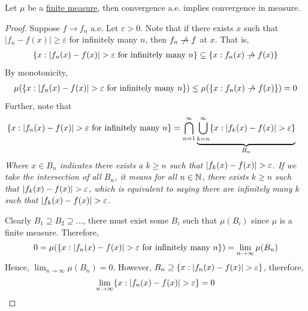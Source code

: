 \documentclass[11pt]{article}
\begin{document}
	\begin{proposition}
		Let $\mu$ be a \ul{finite measure}, then convergence a.e. implies convergence in measure.
		\begin{proof}
			Suppose $f \to f_n$ a.e. Let $\varepsilon > 0$. Note that if there exists $x$ such that $|f_n - f(x)| \geq \varepsilon$ for infinitely many $n$, then $f_n \centernot{\to} f$ at $x$. That is,
			\begin{align}
				\{x: \abs{f_n(x) - f(x)} > \varepsilon \tx{ for infinitely many $n$}\} \subseteq \{x: f_n(x) \centernot{\to} f(x)\}
			\end{align}
			By monotonicity,
			\begin{align}
				\mu(\{x: \abs{f_n(x) - f(x)} > \varepsilon \tx{ for infinitely many $n$}\}) \leq \mu(\{x: f_n(x) \centernot{\to} f(x)\}) = 0
			\end{align}
			Further, note that
			\begin{align}
				\{x: \left \vert {f_n(x) - f(x)} \right \vert > \varepsilon \text{{ for infinitely many $n$}}\}
				&= \bigcap_{n=1}^\infty 
				\underbrace{\bigcup_{k=n}^\infty \{x : \left \vert {f_k(x) - f(x)} \right \vert > \varepsilon\}}_{B_n}
			\end{align}
			\emph{Where $x \in B_n$ indicates there exists a $k \geq n$ such that $\left \vert {f_k(x) - f(x)} \right \vert > \varepsilon$. If we take the intersection of all $B_n$, it means for all $n \in \mathbb{N}$, there exists $k \geq n$ such that $\left \vert {f_k(x) - f(x)} \right \vert > \varepsilon$, which is equivalent to saying there are infinitely many $k$ such that $\left \vert {f_k(x) - f(x)} \right \vert > \varepsilon$.}
			
			Clearly $B_1 \supseteq B_2 \supseteq \dots$, there must exist some $B_i$ such that $\mu(B_i)$ since $\mu$ is a finite measure.
			Therefore,
			\begin{align}
				0 = \mu(\{x: \left \vert {f_n(x) - f(x)} \right \vert > \varepsilon \text{{ for infinitely many $n$}}\}) = \lim_{n\to\infty} \mu(B_n)
			\end{align}
			Hence, $\lim_{n \to \infty} \mu(B_n) = 0$.
			However, $B_n \supseteq \{x : \left \vert {f_n(x) - f(x)} \right \vert > \varepsilon\}$, therefore,
			\begin{align}
				\lim_{n \to \infty} \{x : \left \vert {f_n(x) - f(x)} \right \vert > \varepsilon\} = 0
			\end{align}
		\end{proof}
	\end{proposition}
	
\end{document}
